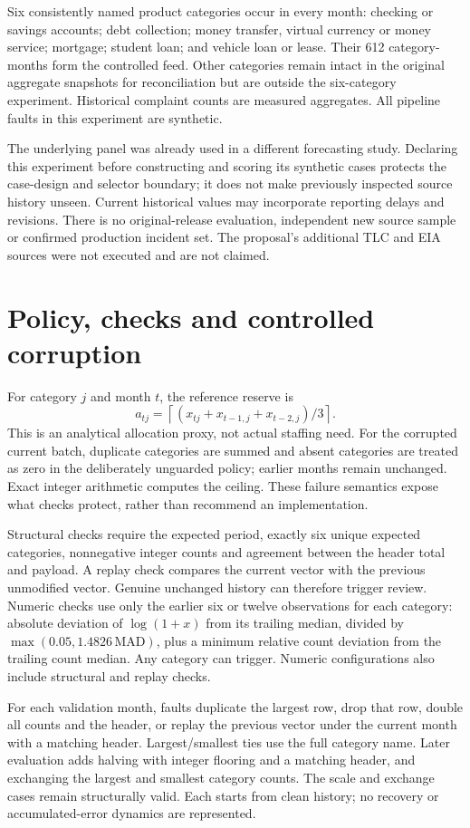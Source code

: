 \documentclass[11pt]{article}
\begin{document}
Six consistently named product categories occur in every month: checking or savings accounts; debt collection; money transfer, virtual currency or money service; mortgage; student loan; and vehicle loan or lease. Their 612 category-months form the controlled feed. Other categories remain intact in the original aggregate snapshots for reconciliation but are outside the six-category experiment. Historical complaint counts are measured aggregates. All pipeline faults in this experiment are synthetic.

The underlying panel was already used in a different forecasting study. Declaring this experiment before constructing and scoring its synthetic cases protects the case-design and selector boundary; it does not make previously inspected source history unseen. Current historical values may incorporate reporting delays and revisions. There is no original-release evaluation, independent new source sample or confirmed production incident set. The proposal's additional TLC and EIA sources were not executed and are not claimed.
\section{Policy, checks and controlled corruption}
For category $j$ and month $t$, the reference reserve is
\[
a_{tj}=\left\lceil (x_{tj}+x_{t-1,j}+x_{t-2,j})/3\right\rceil.
\]
This is an analytical allocation proxy, not actual staffing need. For the corrupted current batch, duplicate categories are summed and absent categories are treated as zero in the deliberately unguarded policy; earlier months remain unchanged. Exact integer arithmetic computes the ceiling. These failure semantics expose what checks protect, rather than recommend an implementation.

Structural checks require the expected period, exactly six unique expected categories, nonnegative integer counts and agreement between the header total and payload. A replay check compares the current vector with the previous unmodified vector. Genuine unchanged history can therefore trigger review. Numeric checks use only the earlier six or twelve observations for each category: absolute deviation of $\log(1+x)$ from its trailing median, divided by $\max(0.05,1.4826\,\mathrm{MAD})$, plus a minimum relative count deviation from the trailing count median. Any category can trigger. Numeric configurations also include structural and replay checks.

For each validation month, faults duplicate the largest row, drop that row, double all counts and the header, or replay the previous vector under the current month with a matching header. Largest/smallest ties use the full category name. Later evaluation adds halving with integer flooring and a matching header, and exchanging the largest and smallest category counts. The scale and exchange cases remain structurally valid. Each starts from clean history; no recovery or accumulated-error dynamics are represented.
\end{document}
